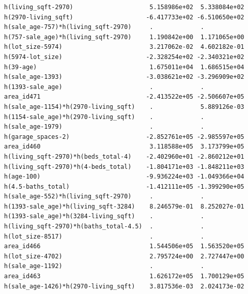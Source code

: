 \documentclass[
]{article}
\begin{document}
\begin{verbatim}
h(living_sqft-2970)                     5.158986e+02  5.338084e+02
h(2970-living_sqft)                    -6.417733e+02 -6.510650e+02
h(sale_age-757)*h(living_sqft-2970)     .             .           
h(757-sale_age)*h(living_sqft-2970)     1.190842e+00  1.171065e+00
h(lot_size-5974)                        3.217062e-02  4.602182e-01
h(5974-lot_size)                       -2.328254e+02 -2.340321e+02
h(39-age)                               1.675011e+04  1.686515e+04
h(sale_age-1393)                       -3.038621e+02 -3.296909e+02
h(1393-sale_age)                        .             .           
area_id471                             -2.413522e+05 -2.506607e+05
h(sale_age-1154)*h(2970-living_sqft)    .             5.889126e-03
h(1154-sale_age)*h(2970-living_sqft)    .             .           
h(sale_age-1979)                        .             .           
h(garage_spaces-2)                     -2.852761e+05 -2.985597e+05
area_id460                              3.118588e+05  3.173799e+05
h(living_sqft-2970)*h(beds_total-4)    -2.402960e+01 -2.860212e+01
h(living_sqft-2970)*h(4-beds_total)    -1.804171e+03 -1.848211e+03
h(age-100)                             -9.936224e+03 -1.049366e+04
h(4.5-baths_total)                     -1.412111e+05 -1.399290e+05
h(sale_age-552)*h(living_sqft-2970)     .             .           
h(1393-sale_age)*h(living_sqft-3284)    8.246579e-01  8.252027e-01
h(1393-sale_age)*h(3284-living_sqft)    .             .           
h(living_sqft-2970)*h(baths_total-4.5)  .             .           
h(lot_size-8517)                        .             .           
area_id466                              1.544506e+05  1.563520e+05
h(lot_size-4702)                        2.795724e+00  2.727447e+00
h(sale_age-1192)                        .             .           
area_id463                              1.626172e+05  1.700129e+05
h(sale_age-1426)*h(2970-living_sqft)    3.817536e-03  2.024173e-02
                                                                  

\end{verbatim}
\end{document}
